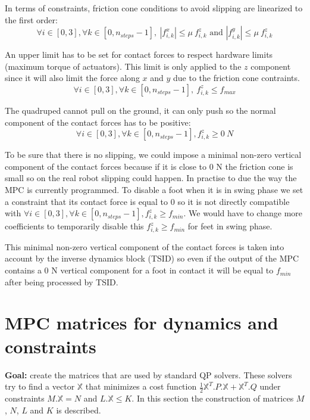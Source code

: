 \documentclass[a4paper,11pt]{article}
\begin{document}
In terms of constraints, friction cone conditions to avoid slipping are linearized to the first order:
\begin{equation}
\forall i \in [0, 3], \forall k \in [0, n_{steps}-1],~|f_{i,k}^x| \leq \mu ~ f_{i,k}^z \text{ and } |f_{i,k}^y| \leq \mu ~ f_{i,k}^z
\end{equation}
 
An upper limit has to be set for contact forces to respect hardware limits (maximum torque of actuators). This limit is only applied to the $z$ component since it will also limit the force along $x$ and $y$ due to the friction cone contraints.
\begin{equation}
\forall i \in [0, 3], \forall k \in [0, n_{steps}-1],~f_{i,k}^z \leq f_{max}
\end{equation}

The quadruped cannot pull on the ground, it can only push so the normal component of the contact forces has to be positive:
\begin{equation}
\forall i \in [0, 3], \forall k \in [0, n_{steps}-1], f_{i,k}^z \geq 0~N
\end{equation}
 
To be sure that there is no slipping, we could impose a minimal non-zero vertical component of the contact forces because if it is close to 0 N the friction cone is small so on the real robot slipping could happen. In practise to due the way the MPC is currently programmed. To disable a foot when it is in swing phase we set a constraint that its contact force is equal to 0 so it is not directly compatible with $\forall i \in [0, 3], \forall k \in [0, n_{steps}-1], f_{i,k}^z \geq f_{min}$. We would have to change more coefficients to temporarily disable this $f_{i,k}^z \geq f_{min}$ for feet in swing phase.

This minimal non-zero vertical component of the contact forces is taken into account by the inverse dynamics block (TSID) so even if the output of the MPC contains a 0 N vertical component for a foot in contact it will be equal to $f_{min}$ after being processed by TSID. 


\newpage
\section{MPC matrices for dynamics and constraints}

\textbf{Goal:} create the matrices that are used by standard QP solvers. These solvers try to find a vector $\mathbb{X}$ that minimizes a cost function $\frac{1}{2}\mathbb{X}^T.P.\mathbb{X} + \mathbb{X}^T.Q$ under constraints $M.\mathbb{X} = N$ and $L.\mathbb{X} \leq K$. In this section the construction of matrices $M$, $N$, $L$ and $K$ is described.
\end{document}
